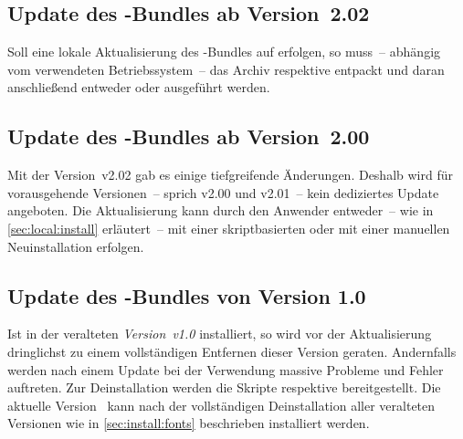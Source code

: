 \subsection{Update des \TUDScript-Bundles ab Version~2.02}
Soll eine lokale Aktualisierung des \TUDScript-Bundles auf \vTUDScript{} 
erfolgen, so muss~-- abhängig vom verwendeten Betriebssystem~-- das Archiv
%
{} respektive 
%
{}
entpackt und daran anschließend entweder  
oder  ausgeführt werden.

\subsection{Update des \TUDScript-Bundles ab Version~2.00}
%
Mit der Version~v2.02 gab es einige tiefgreifende Änderungen. Deshalb wird für 
vorausgehende Versionen~-- sprich v2.00 und v2.01~-- kein dediziertes Update 
angeboten. Die Aktualisierung kann durch den Anwender entweder~-- wie in 
\autoref{sec:local:install} erläutert~-- mit einer skriptbasierten oder mit 
einer manuellen Neuinstallation erfolgen.
%


\subsection{Update des \TUDScript-Bundles von Version 1.0}
%
Ist \TUDScript in der veralteten \emph{Version~v1.0} installiert, so wird vor 
der Aktualisierung dringlichst zu einem vollständigen Entfernen dieser Version 
geraten. Andernfalls werden nach einem Update bei der Verwendung massive 
Probleme und Fehler auftreten. Zur Deinstallation werden die Skripte 
respektive
bereitgestellt. Die aktuelle Version~\vTUDScript{} kann nach der vollständigen 
Deinstallation aller veralteten Versionen wie in \autoref{sec:install:fonts} 
beschrieben installiert werden.


